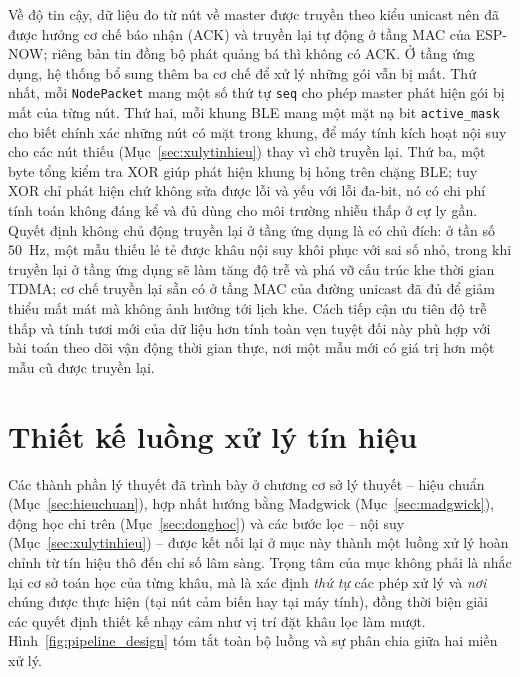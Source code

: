 \documentclass[../DoAn.tex]{subfiles}
\begin{document}
Về độ tin cậy, dữ liệu đo từ nút về master được truyền theo kiểu unicast nên đã được hưởng cơ chế báo nhận (ACK) và truyền lại tự động ở tầng MAC của ESP-NOW; riêng bản tin đồng bộ phát quảng bá thì không có ACK. Ở tầng ứng dụng, hệ thống bổ sung thêm ba cơ chế để xử lý những gói vẫn bị mất. Thứ nhất, mỗi
\texttt{NodePacket} mang một số thứ tự \texttt{seq} cho phép master phát hiện gói
bị mất của từng nút. Thứ hai, mỗi khung BLE mang một mặt nạ bit
\texttt{active\_mask} cho biết chính xác những nút có mặt trong khung, để máy tính
kích hoạt nội suy cho các nút thiếu (Mục~\ref{sec:xulytinhieu}) thay vì chờ truyền
lại. Thứ ba, một byte tổng kiểm tra XOR giúp phát hiện khung bị hỏng trên chặng
BLE; tuy XOR chỉ phát hiện chứ không sửa được lỗi và yếu với lỗi đa-bit, nó có
chi phí tính toán không đáng kể và đủ dùng cho môi trường nhiễu thấp ở cự ly gần.
Quyết định không chủ động truyền lại ở tầng ứng dụng là có chủ đích: ở tần số $50$~Hz, một mẫu thiếu lẻ tẻ được khâu nội suy khôi phục với sai số nhỏ, trong khi truyền lại ở tầng ứng dụng sẽ làm tăng độ trễ và phá vỡ cấu trúc khe thời gian TDMA; cơ chế truyền lại sẵn có ở tầng MAC của đường unicast đã đủ để giảm thiểu mất mát mà không ảnh hưởng tới lịch khe. Cách tiếp cận ưu tiên độ
trễ thấp và tính tươi mới của dữ liệu hơn tính toàn vẹn tuyệt đối này phù hợp với
bài toán theo dõi vận động thời gian thực, nơi một mẫu mới có giá trị hơn một mẫu
cũ được truyền lại.

\section{Thiết kế luồng xử lý tín hiệu}
\label{sec:luongxuly}

Các thành phần lý thuyết đã trình bày ở chương cơ sở lý thuyết -- hiệu chuẩn
(Mục~\ref{sec:hieuchuan}), hợp nhất hướng bằng Madgwick (Mục~\ref{sec:madgwick}),
động học chi trên (Mục~\ref{sec:donghoc}) và các bước lọc -- nội suy
(Mục~\ref{sec:xulytinhieu}) -- được kết nối lại ở mục này thành một luồng xử lý
hoàn chỉnh từ tín hiệu thô đến chỉ số lâm sàng. Trọng tâm của mục không phải là
nhắc lại cơ sở toán học của từng khâu, mà là xác định \textit{thứ tự} các phép xử
lý và \textit{nơi} chúng được thực hiện (tại nút cảm biến hay tại máy tính), đồng
thời biện giải các quyết định thiết kế nhạy cảm như vị trí đặt khâu lọc làm mượt.
Hình~\ref{fig:pipeline_design} tóm tắt toàn bộ luồng và sự phân chia giữa hai miền
xử lý.
\end{document}
